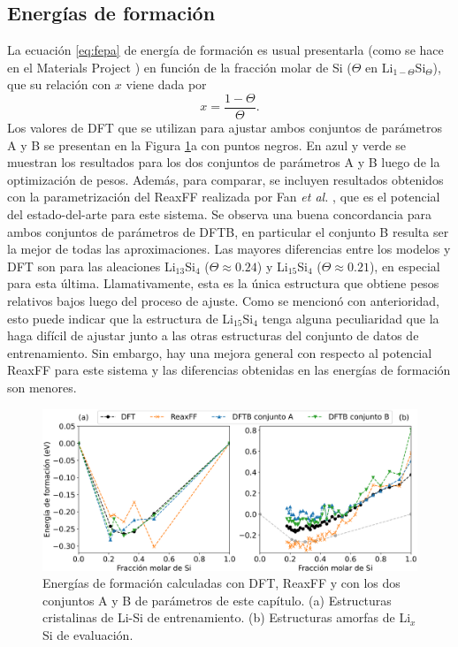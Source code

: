 \subsection{Energías de formación}

La ecuación \ref{eq:fepa} de energía de formación es usual presentarla (como
se hace en el Materials Project \cite{materials_project}) en función
de la fracción molar de Si ($\Theta$ en Li$_{1-\Theta}$Si$_\Theta$), que
su relación con $x$ viene dada por
\begin{equation}
	x = \frac{1 - \Theta}{\Theta}.
\end{equation}
Los valores de DFT que se utilizan para ajustar ambos conjuntos de parámetros
A y B se presentan en la Figura \ref{fig:eform}a con puntos negros. En azul
y verde se muestran los resultados para los dos conjuntos de parámetros A y B
luego de la optimización de pesos. Además, para comparar, se incluyen resultados
obtenidos con la parametrización del ReaxFF realizada por Fan \textit{et al.}
\cite{fan2013}, que es el potencial del estado-del-arte para este sistema. 
Se observa una buena concordancia para ambos conjuntos de parámetros
de DFTB, en particular el conjunto B resulta ser la mejor de todas las
aproximaciones. Las mayores diferencias entre los modelos y DFT son para las
aleaciones Li$_{13}$Si$_4$ ($\Theta \approx 0.24$) y Li$_{15}$Si$_4$
($\Theta \approx 0.21$), en especial para esta última. Llamativamente, esta es
la única estructura que obtiene pesos relativos bajos luego del proceso de
ajuste. Como se mencionó con anterioridad, esto puede indicar que la estructura
de Li$_{15}$Si$_4$ tenga alguna peculiaridad que la haga difícil de ajustar
junto a las otras estructuras del conjunto de datos de entrenamiento. Sin
embargo, hay una mejora general con respecto al potencial ReaxFF para este
sistema y las diferencias obtenidas en las energías de formación son menores.

\begin{figure}[h]
	\centering
	\includegraphics[width=\textwidth]{Silicio/modelo/resultados/formacion/energias.png}
	\caption{Energías de formación calculadas con DFT, ReaxFF y con los dos
	conjuntos A y B de parámetros de este capítulo. (a) Estructuras cristalinas
	de Li-Si de entrenamiento. (b) Estructuras amorfas de Li$_x$Si de evaluación.}
	\label{fig:eform}
\end{figure}

